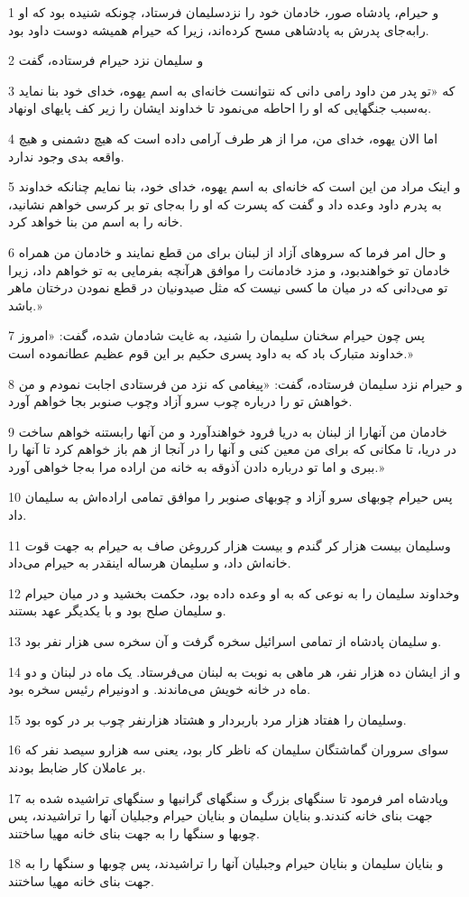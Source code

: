 \par 1 و حیرام، پادشاه صور، خادمان خود را نزدسلیمان فرستاد، چونکه شنیده بود که او رابه‌جای پدرش به پادشاهی مسح کرده‌اند، زیرا که حیرام همیشه دوست داود بود.
\par 2 و سلیمان نزد حیرام فرستاده، گفت
\par 3 که «تو پدر من داود رامی دانی که نتوانست خانه‌ای به اسم یهوه، خدای خود بنا نماید به‌سبب جنگهایی که او را احاطه می‌نمود تا خداوند ایشان را زیر کف پایهای اونهاد.
\par 4 اما الان یهوه، خدای من، مرا از هر طرف آرامی داده است که هیچ دشمنی و هیچ واقعه بدی وجود ندارد.
\par 5 و اینک مراد من این است که خانه‌ای به اسم یهوه، خدای خود، بنا نمایم چنانکه خداوند به پدرم داود وعده داد و گفت که پسرت که او را به‌جای تو بر کرسی خواهم نشانید، خانه را به اسم من بنا خواهد کرد.
\par 6 و حال امر فرما که سروهای آزاد از لبنان برای من قطع نمایند و خادمان من همراه خادمان تو خواهندبود، و مزد خادمانت را موافق هرآنچه بفرمایی به تو خواهم داد، زیرا تو می‌دانی که در میان ما کسی نیست که مثل صیدونیان در قطع نمودن درختان ماهر باشد.»
\par 7 پس چون حیرام سخنان سلیمان را شنید، به غایت شادمان شده، گفت: «امروز خداوند متبارک باد که به داود پسری حکیم بر این قوم عظیم عطانموده است.»
\par 8 و حیرام نزد سلیمان فرستاده، گفت: «پیغامی که نزد من فرستادی اجابت نمودم و من خواهش تو را درباره چوب سرو آزاد وچوب صنوبر بجا خواهم آورد.
\par 9 خادمان من آنهارا از لبنان به دریا فرود خواهند‌آورد و من آنها رابستنه خواهم ساخت در دریا، تا مکانی که برای من معین کنی و آنها را در آنجا از هم باز خواهم کرد تا آنها را ببری و اما تو درباره دادن آذوقه به خانه من اراده مرا به‌جا خواهی آورد.»
\par 10 پس حیرام چوبهای سرو آزاد و چوبهای صنوبر را موافق تمامی اراده‌اش به سلیمان داد.
\par 11 وسلیمان بیست هزار کر گندم و بیست هزار کرروغن صاف به حیرام به جهت قوت خانه‌اش داد، و سلیمان هرساله اینقدر به حیرام می‌داد.
\par 12 وخداوند سلیمان را به نوعی که به او وعده داده بود، حکمت بخشید و در میان حیرام و سلیمان صلح بود و با یکدیگر عهد بستند.
\par 13 و سلیمان پادشاه از تمامی اسرائیل سخره گرفت و آن سخره سی هزار نفر بود.
\par 14 و از ایشان ده هزار نفر، هر ماهی به نوبت به لبنان می‌فرستاد. یک ماه در لبنان و دو ماه در خانه خویش می‌ماندند. و ادونیرام رئیس سخره بود.
\par 15 وسلیمان را هفتاد هزار مرد باربردار و هشتاد هزارنفر چوب بر در کوه بود.
\par 16 سوای سروران گماشتگان سلیمان که ناظر کار بود، یعنی سه هزارو سیصد نفر که بر عاملان کار ضابط بودند.
\par 17 وپادشاه امر فرمود تا سنگهای بزرگ و سنگهای گرانبها و سنگهای تراشیده شده به جهت بنای خانه کندند.و بنایان سلیمان و بنایان حیرام وجبلیان آنها را تراشیدند، پس چوبها و سنگها را به جهت بنای خانه مهیا ساختند.
\par 18 و بنایان سلیمان و بنایان حیرام وجبلیان آنها را تراشیدند، پس چوبها و سنگها را به جهت بنای خانه مهیا ساختند.
 
